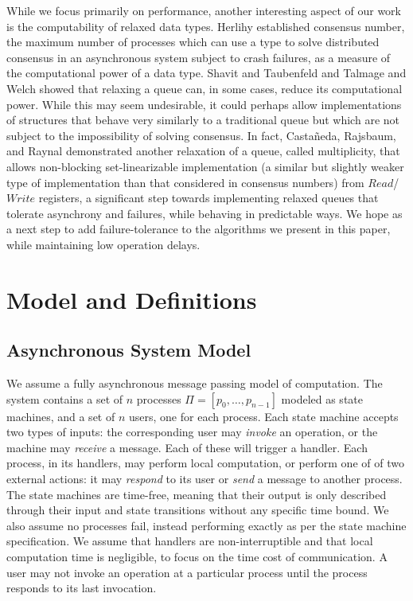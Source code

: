 \documentclass[a4paper,anonymous,USenglish]{lipics-v2021}
\theoremstyle{definition}
\begin{document}
While we focus primarily on performance, another interesting aspect of our work is the computability of relaxed data types.  Herlihy \cite{Herlihy91} established consensus number, the maximum number of processes which can use a type to solve distributed consensus in an asynchronous system subject to crash failures, as a measure of the computational power of a data type.  Shavit and Taubenfeld \cite{ShavitTaubenfeld16} and Talmage and Welch \cite{TalmageWelch19} showed that relaxing a queue can, in some cases, reduce its computational power. While this may seem undesirable, it could perhaps allow implementations of structures that behave very similarly to a traditional queue but which are not subject to the impossibility of solving consensus.  In fact, Casta{\~n}eda, Rajsbaum, and Raynal \cite{CastanedaRajsbaumRaynal20} demonstrated another relaxation of a queue, called multiplicity, that allows non-blocking set-linearizable implementation (a similar but slightly weaker type of implementation than that considered in consensus numbers) from $Read$/$Write$ registers, a significant step towards implementing relaxed queues that tolerate asynchrony and failures, while behaving in predictable ways.  We hope as a next step to add failure-tolerance to the algorithms we present in this paper, while maintaining low operation delays.

\section{Model and Definitions}

\subsection{Asynchronous System Model}
We assume a fully asynchronous message passing model of computation.  The system contains a set of $n$ processes $\Pi = [p_0, \dots , p_{n-1}]$ modeled as state machines, and a set of $n$ users, one for each process.  Each state machine accepts two types of inputs: the corresponding user may \emph{invoke} an operation, or the machine may \emph{receive} a message.  Each of these will trigger a handler.  Each process, in its handlers, may perform local computation, or perform one of of two external actions: it may \emph{respond} to its user or \emph{send} a message to another process.  The state machines are time-free, meaning that their output is only described through their input and state transitions without any specific time bound.  We also assume no processes fail, instead performing exactly as per the state machine specification.  We assume that handlers are non-interruptible and that local computation time is negligible, to focus on the time cost of communication.  A user may not invoke an operation at a particular process until the process responds to its last invocation.
\end{document}
